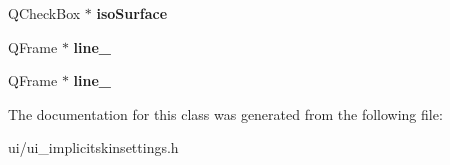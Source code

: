 \begin{DoxyCompactItemize}
\item 
Q\+Check\+Box $\ast$ {\bfseries iso\+Surface}\hypertarget{classUi__ImplicitSkinSettings_afe4703f23a8869163746da0126c6921c}{}\label{classUi__ImplicitSkinSettings_afe4703f23a8869163746da0126c6921c}

\item 
Q\+Frame $\ast$ {\bfseries line\+\_}\hypertarget{classUi__ImplicitSkinSettings_a01b3ec23016f4f7ea33c70b8e5bcdb43}{}\label{classUi__ImplicitSkinSettings_a01b3ec23016f4f7ea33c70b8e5bcdb43}

\item 
Q\+Frame $\ast$ {\bfseries line\+\_}\hypertarget{classUi__ImplicitSkinSettings_ad720995c211996d0f7f649fd6303a10f}{}\label{classUi__ImplicitSkinSettings_ad720995c211996d0f7f649fd6303a10f}

\end{DoxyCompactItemize}


The documentation for this class was generated from the following file\+:\begin{DoxyCompactItemize}
\item 
ui/ui\+\_\+implicitskinsettings.\+h\end{DoxyCompactItemize}
